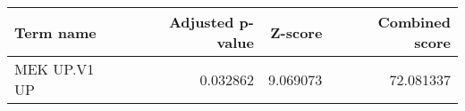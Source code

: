 \begin{tabular}{lrrr}
\toprule
   Term name &  Adjusted p-value &  Z-score &  Combined score \\
\midrule
MEK UP.V1 UP &          0.032862 & 9.069073 &       72.081337 \\
\bottomrule
\end{tabular}
